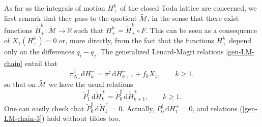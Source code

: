 \documentclass[12pt]{article}
\def\d{{\mathrm d}}
\newcommand{\RR}{{{\mathbb{R}}}}
\def\M{{\mathcal M}}
\begin{document}
As far as the integrals of motion $H^k_+$ of the closed Toda lattice are concerned, we first remark that they pass to the 
quotient $\widetilde\M$, in the sense that there exist functions $\widetilde{H}^k_+:\widetilde\M\to\RR$ such that 
${H}^k_+=\widetilde{H}^k_+\circ F$. This can be seen as a consequence of $X_1({H}^k_+)=0$ or, more directly, from the fact that the functions 
${H}^k_+$ depend only on the differences $q_i-q_{j}$. The generalized Lenard-Magri relations \eqref{gen-LM-chain} entail that 
\begin{equation}
\label{gen-LM-chain-2}
\pi_{N_-}^\sharp \d H_k^+ = \pi^\sharp \,\d H_{k+1}^+ + f_k X_1,\qquad k\ge 1,
\end{equation}
so that on $\widetilde\M$ %
we have the usual relations
\begin{equation}
\label{gen-LM-chain-3}
 \widetilde{P}_1^\sharp\,\d \widetilde{H}_k^+ = \widetilde{P}_0^\sharp\,\d \widetilde{H}_{k+1}^+,\qquad k\ge 1.
\end{equation}
One can easily check that $\widetilde{P}_0^\sharp\,\d \widetilde{H}_{1}^+=0$. Actually, 
${P}_0^\sharp\,\d {H}_{1}^+=0$, and relations (\ref{gen-LM-chain-3}) hold without tildes too.

\end{document}
